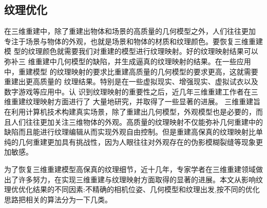\subsection{纹理优化}
在三维重建中，除了重建出物体和场景的高质量的几何模型之外，人们往往更加 专注于场景与物体的外观，也就是场景和物体的材质和纹理颜色。要恢复三维重建模 型的纹理颜色就需要我们对重建的模型进行纹理映射。好的纹理映射结果可以弥补三 维重建中几何模型的缺陷，并生成逼真的纹理映射的结果。在一些应用中，重建模型 的纹理映射的要求比重建高质量的几何模型的要求更高，这就需要重建出更高质量的 纹理结果。特别是在一些虚拟现实、增强现实、虚拟试衣以及数字游戏等应用中。认 识到纹理映射的重要性之后，近几年三维重建工作者在三维重建纹理映射方面进行了 大量地研究，并取得了一些显著的进展。
三维重建旨在利用计算机技术构建真实场景，除了重建出几何模型，外观模型也是必要的，而且人们往往更加关注三维物体的外观。高质量的纹理映射不仅能弥补几何重建中的缺陷而且能进行纹理编辑从而实现外观自由控制。但是重建高保真的纹理映射比单纯的几何重建更加具有挑战性，因为人眼往往对外观存在的伪影模糊裂缝等现象更加敏感。 \par
为了恢复三维重建模型高保真的纹理细节，近十几年，专家学者在三维重建领域做出了许多努力，在实现三维重建与纹理映射方面取得的显著的进展。本文从影响纹理优优化结果的不同因素:不精确的相机位姿、几何模型和纹理出发,按不同的优化思路把相关的算法分为一下几类。\par

